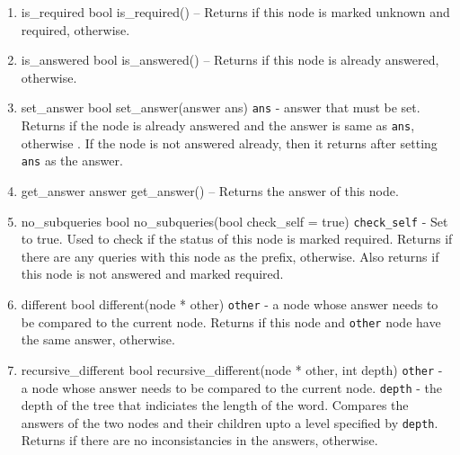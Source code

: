 \begin{enumerate}
\begin{detail}
\end{detail}
\item \begin{detail}
{is\_required}
{bool is\_required()}
{--}
{Returns \true if this node is marked unknown and required, \false otherwise.} 
\end{detail}
\item \begin{detail}
{is\_answered}
{bool is\_answered()}
{--}
{Returns \true if this node is already answered, \false otherwise.} 
\end{detail}
\item \begin{detail}
{set\_answer}
{bool set\_answer(answer ans)}
{\texttt{ans} - answer that must be set.}
{Returns \true if the node is already answered and the answer is same as \texttt{ans}, otherwise \false. If the node is not answered already, then it returns \true after setting \texttt{ans} as the answer.} 
\end{detail}
\item \begin{detail}
{get\_answer}
{answer get\_answer()}
{--}
{Returns the answer of this node.} 
\end{detail}
\item \begin{detail}
{no\_subqueries}
{bool no\_subqueries(bool check\_self = true)}
{\texttt{check\_self} - Set to true. Used to check if the status of this node is marked required. }
{Returns \true if there are any queries with this node as the prefix, \false otherwise. Also returns \false if this node is not answered and marked required.} 
\end{detail}
\item \begin{detail}
{different}
{bool different(node * other)}
{\texttt{other} - a node whose answer needs to be compared to the current node. }
{Returns \true if this node and \texttt{other} node have the same answer, \false otherwise. } 
\end{detail}
\item \begin{detail}
{recursive\_different}
{bool recursive\_different(node * other, int depth)}
{\texttt{other} - a node whose answer needs to be compared to the current node.
 \texttt{depth} - the depth of the tree that indiciates the length of the word. }
{Compares the answers of the two nodes and their children upto a level specified by \texttt{depth}. Returns \true if there are no inconsistancies in the answers, \false otherwise. } 

\end{detail}
\end{enumerate}
